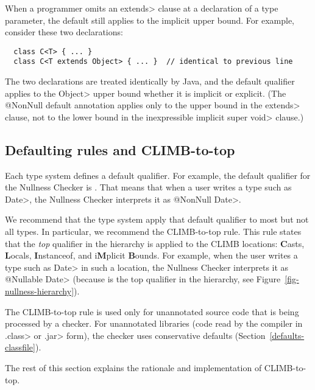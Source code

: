 When a programmer omits an \<extends> clause at a declaration of a type
parameter, the default still applies to the implicit upper bound.  For
example, consider these two declarations:

\begin{Verbatim}
  class C<T> { ... }
  class C<T extends Object> { ... }  // identical to previous line
\end{Verbatim}

\noindent
The two declarations are treated identically by Java, and the default
qualifier applies to the \<Object> upper bound whether it is implicit or
explicit.  (The @NonNull default annotation applies only to the upper bound
in the \<extends> clause, not to the lower bound in the inexpressible
implicit \<super void> clause.)


\subsection{Defaulting rules and CLIMB-to-top\label{climb-to-top}}

Each type system defines a default qualifier.  For example, the default
qualifier for the Nullness Checker is
.  That means that when a user
writes a type such as \<Date>, the Nullness Checker interprets it as
\<@NonNull Date>.

We recommend that the type system apply that default qualifier to most but
not all types.  In particular, we recommend the CLIMB-to-top rule.  This
rule states that the \emph{top} qualifier in the hierarchy is applied to
the CLIMB locations:  \textbf{C}asts, \textbf{L}ocals, \textbf{I}nstanceof, and i\textbf{M}plicit \textbf{B}ounds.
For example, when the user writes a type such as \<Date> in such a
location, the Nullness Checker interprets it as \<@Nullable Date> (because
 is the top qualifier in the
hierarchy, see Figure~\ref{fig-nullness-hierarchy}).


The CLIMB-to-top rule is used only for unannotated source code that is
being processed by a checker.  For unannotated libraries (code read by the
compiler in \<.class> or \<.jar> form), the checker uses conservative
defaults (Section~\ref{defaults-classfile}).

The rest of this section explains the rationale and implementation of
CLIMB-to-top.

